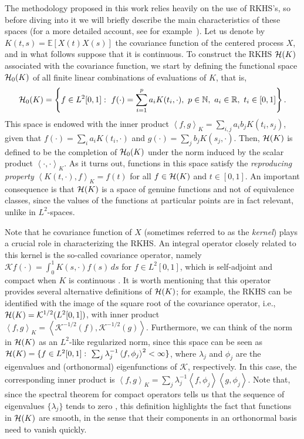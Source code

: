 \documentclass[ba]{imsart}
\numberwithin{equation}{section}
\theoremstyle{plain}
\newcommand{\N}{\mathbb{N}}
\newcommand{\R}{\mathbb{R}}
\newcommand{\Hcal}{\ensuremath\mathcal{H}}
\newcommand\dotprod[2]{\left\langle #1, #2 \right\rangle}
\begin{document}
The methodology proposed in this work relies heavily on the use of RKHS's, so before diving into it we will briefly describe the main characteristics of these spaces (for a more detailed account, see for example~\citet{berlinet2004reproducing}). Let us denote by \(K(t, s)= \mathbb E[X(t)X(s)]\) the covariance function of the centered process \(X\), and in what follows suppose that it is continuous. To construct the RKHS \(\Hcal(K)\) associated with the covariance function, we start by defining the functional space \(\Hcal_0(K)\) of all finite linear combinations of evaluations of \(K\), that is,
\begin{equation}\label{eq:h0}
\Hcal_0(K) = \left\{ f \in L^2[0,1]: \ f(\cdot) = \sum_{i=1}^p a_i K(t_i, \cdot), \ p \in \N, \ a_i \in \R, \ t_i \in [0, 1] \right\}.
\end{equation}
This space is endowed with the inner product \(\dotprod{f}{g}_K = \sum_{i, j} a_i b_j K(t_i, s_j)\), given that \(f(\cdot)=\sum_i a_i K(t_i, \cdot) \) and \(g(\cdot)=\sum_j b_j K(s_j, \cdot)\). Then, \(\Hcal(K)\) is defined to be the completion of \(\Hcal_0(K)\) under the norm induced by the scalar product \(\dotprod{\cdot}{\cdot}_K\). As it turns out, functions in this space satisfy the \textit{reproducing property} \(\dotprod{K(t, \cdot)}{f}_K = f(t)\) for all \(f \in \Hcal(K)\) and \(t \in [0, 1]\). An important consequence is that \(\Hcal(K)\) is a space of genuine functions and not of equivalence classes, since the values of the functions at particular points are in fact relevant, unlike in \(L^2\)-spaces.

Note that he covariance function of \(X\) (sometimes referred to as the \textit{kernel}) plays a crucial role in characterizing the RKHS. An integral operator closely related to this kernel is the so-called covariance operator, namely \(\mathcal Kf(\cdot) = \int_0^1 K(s, \cdot)f(s)\, ds\) for \(f \in L^2[0, 1]\), which is self-adjoint and compact when \(K\) is continuous \citep[e.g.][Th.~4.6.2]{hsing2015theoretical}. It is worth mentioning that this operator provides several alternative definitions of \(\Hcal(K)\); for example, the RKHS can be identified with the image of the square root of the covariance operator, i.e., \(\Hcal(K) = \mathcal K^{1/2}(L^2[0, 1])\), with inner product \(\dotprod{f}{g}_K = \dotprod{\mathcal K^{-1/2}(f)}{\mathcal K^{-1/2}(g)}\). Furthermore, we can think of the norm in \(\Hcal(K)\) as an \(L^2\)-like regularized norm, since this space can be seen as \(\Hcal(K) = \{f \in L^2[0, 1]: \ \sum_j \lambda_j^{-1}\dotprod{f}{\phi_j}^2 < \infty \}\), where \(\lambda_j\) and \(\phi_j\) are the eigenvalues and (orthonormal) eigenfunctions of \(\mathcal K\), respectively. In this case, the corresponding inner product is \(\dotprod{f}{g}_K = \sum_j \lambda_j^{-1}\dotprod{f}{\phi_j}\dotprod{g}{\phi_j}\). Note that, since the spectral theorem for compact operators tells us that the sequence of eigenvalues \(\{\lambda_j\}\) tends to zero \citep[e.g.][Th.~4.2.4]{hsing2015theoretical}, this definition highlights the fact that functions in \(\Hcal(K)\) are smooth, in the sense that their components in an orthonormal basis need to vanish quickly.
\end{document}
